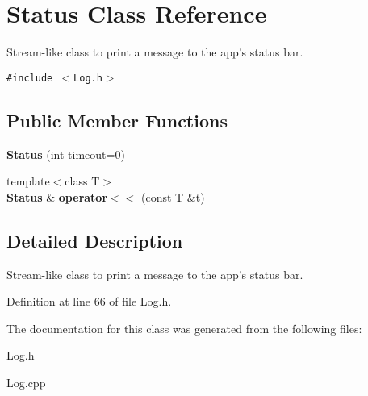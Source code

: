 \section{Status Class Reference}
\label{classStatus}
Stream-like class to print a message to the app's status bar.  


{\tt \#include $<$Log.h$>$}

\subsection*{Public Member Functions}
\begin{CompactItemize}
\item 
\textbf{Status} (int timeout=0)\label{classStatus_f114ca63223e3d1d64fddeb2b7e69bb5}

\item 
{\footnotesize template$<$class T$>$ }\\{\bf Status} \& \textbf{operator$<$$<$} (const T \&t)\label{classStatus_80804dfa821ca5f0abd1ff23eaf896ca}

\end{CompactItemize}


\subsection{Detailed Description}
Stream-like class to print a message to the app's status bar. 

Definition at line 66 of file Log.h.

The documentation for this class was generated from the following files:\begin{CompactItemize}
\item 
Log.h\item 
Log.cpp\end{CompactItemize}
